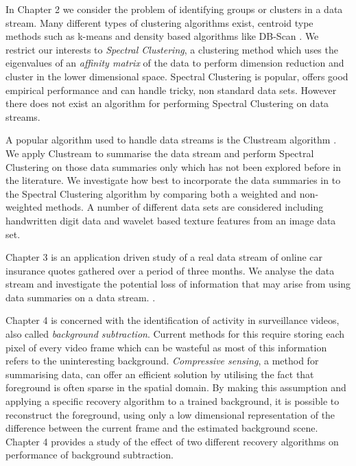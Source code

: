 In Chapter 2 we consider the problem of identifying groups or clusters in a data stream.  Many different types of clustering algorithms exist, centroid type methods such as k-means \citep{MacQueen1967, Lloyd1982} and density based algorithms like DB-Scan \citep{Ester1996}. We restrict our interests to \textit{Spectral Clustering}, a clustering method which uses the eigenvalues of an \textit{affinity matrix} of the data to perform dimension reduction and cluster in the lower dimensional space. Spectral Clustering is popular, offers good empirical performance and can handle tricky, non standard data sets. However there does not exist an algorithm for performing Spectral Clustering on data streams.

A popular algorithm used to handle data streams is the Clustream algorithm \citep{Aggarwal2003}. We apply Clustream to summarise the data stream and perform Spectral Clustering on those data summaries only which has not been explored before in the literature. We investigate how best to incorporate the data summaries in to the Spectral Clustering algorithm by comparing both a weighted and non-weighted methods. A number of different data sets are considered including handwritten digit data and wavelet based texture features from an image data set.   

Chapter 3 is an application driven study of a real data stream of online car insurance quotes gathered over a period of three months.  We analyse the data stream and investigate the potential loss of information that may arise from using data summaries on a data stream. .

Chapter 4 is concerned with the identification of activity in surveillance videos, also called \textit{background subtraction}. Current methods for this require storing each pixel of every video frame which can be wasteful as most of this information refers to the uninteresting background. \textit{Compressive sensing}, a method for summarising data, can offer an efficient solution by utilising the fact that foreground is often sparse in the spatial domain. By making this assumption and applying a specific recovery algorithm to a trained background, it is possible to reconstruct the foreground, using only a low dimensional representation of the difference between the current frame and the estimated background scene. Chapter 4 provides a study of the effect of two different recovery algorithms on performance of background subtraction.

